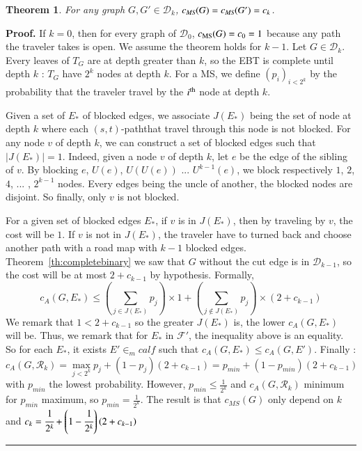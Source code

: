 \documentclass[preprint]{elsarticle}
\newtheorem{theorem}{Theorem}
\newenvironment{proof}[1][Proof]{\textbf{#1.} }{\ \rule{0.5em}{0.5em}}
\newcommand{\card}[1]{\left| #1 \right|}
\newcommand{\ith}[1]{#1^{\mbox{\scriptsize{th}}}}
\newcommand{\stpath}{$(s,t)$-path}
\newcommand{\mcalr}{\mathcal{R}}
\newcommand{\mcald}{\mathcal{D}}
\newcommand{\mcalf}{\mathcal{F}}
\newcommand{\mts}{MS}
\newcommand{\cms}{c_{\mbox{\scriptsize{MS}}}}
\begin{document}
\begin{theorem}
For any graph $G, G' \in \mcald_k$, $c_{\emph{\scriptsize{MS}}}(G) = c_{\emph{\scriptsize{MS}}}(G') = c_k$.
\label{th:equalcompetitive}
\end{theorem}
\begin{proof}
If $k = 0$, then for every graph of $\mcald_0$, $\cms(G) = c_0 = 1$ because any path the traveler takes is open.
We assume the theorem holds for $k-1$. Let $G \in \mcald_k$. Every leaves of $T_G$ are at depth greater than $k$, so the EBT is complete until depth $k$ : $T_G$ have $2^k$ nodes at depth $k$. For a \mts, we define $(p_i)_{i < 2^k}$ by the probability that the traveler travel by the $\ith{i}$ node at depth $k$.

Given a set of $E_*$ of blocked edges, we associate $J(E_*)$ being the set of node at depth $k$ where each \stpath that travel through this node is not blocked. For any node $v$ of depth $k$, we can construct a set of blocked edges such that $\card{J(E_*)} = 1$. Indeed, given a node $v$ of depth $k$, let $e$ be the edge of the sibling of $v$. By blocking $e$,  $U(e)$, $U(U(e))$ ... $U^{k-1}(e)$, we block respectively $1$, $2$, $4$, ... , $2^{k-1}$ nodes. Every edges being the uncle of another, the blocked nodes are disjoint. So finally, only $v$ is not blocked.

For a given set of blocked edges $E_*$, if $v$ is in $J(E_*)$, then by traveling by $v$, the cost will be $1$. If $v$ is not in $J(E_*)$, the traveler have to turned back and choose another path with a road map with $k-1$ blocked edges. Theorem~\ref{th:completebinary} we saw that $G$ without the cut edge is in $\mcald_{k-1}$, so the cost will be at most $2 + c_{k-1}$ by hypothesis. Formally,
\[
c_A(G, E_*) \leq \left(\sum_{j\in J(E_*)} p_j\right)\times 1 + \left(\sum_{j\notin J(E_*)}p_j\right)\times (2+c_{k-1})
\]
We remark that $1 < 2 + c_{k-1}$ so the greater $J(E_*)$ is, the lower $c_A(G, E_*)$ will be. Thus, we remark that for $E_*$ in $\mcalf'$, the inequality above is an equality. So for each $E_*$, it exists $E' \in _mcalf$ such that $c_A(G, E_*) \leq c_A(G, E')$. Finally :
\[
c_A(G, \mcalr_k) = \max_{j < 2^k} p_j + (1-p_j)(2+c_{k-1}) = p_{min} + (1-p_{min})(2+c_{k-1})
\]
with $p_{min}$ the lowest probability. However, $p_{min} \leq \frac{1}{2^k}$ and $c_A(G, \mcalr_k)$ minimum for $p_{min}$ maximum, so $p_{min} = \frac{1}{2^k}$. The result is that $c_{\mts}(G)$ only depend on $k$ and $c_k = \cfrac{1}{2^k} + \left(1-\cfrac{1}{2^k}\right)\left(2+c_{k-1}\right)$
\end{proof}
\end{document}
